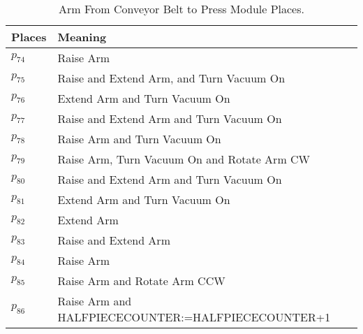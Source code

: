 \begin{table}[H]
\caption{Arm From Conveyor Belt to Press Module Places.}
\centering
\begin{tabular}{M{5cm}M{10cm}}
Places & Meaning\\
\hline
\hyperlink{partialNet:p741}{\hypertarget{partialTable:p74}{$p_{74}$}} & Raise Arm\\
\hyperlink{partialNet:p751}{\hypertarget{partialTable:p75}{$p_{75}$}} & Raise and Extend Arm, and Turn Vacuum On\\
\hyperlink{partialNet:p761}{\hypertarget{partialTable:p76}{$p_{76}$}} & Extend Arm and Turn Vacuum On\\
\hyperlink{partialNet:p771}{\hypertarget{partialTable:p77}{$p_{77}$}} & Raise and Extend Arm and Turn Vacuum On\\
\hyperlink{partialNet:p781}{\hypertarget{partialTable:p78}{$p_{78}$}} & Raise Arm and Turn Vacuum On\\
\hyperlink{partialNet:p791}{\hypertarget{partialTable:p79}{$p_{79}$}} & Raise Arm, Turn Vacuum On and  Rotate Arm CW\\
\hyperlink{partialNet:p801}{\hypertarget{partialTable:p80}{$p_{80}$}} & Raise and Extend Arm and Turn Vacuum On\\
\hyperlink{partialNet:p811}{\hypertarget{partialTable:p81}{$p_{81}$}} & Extend Arm and  Turn Vacuum On\\
\hyperlink{partialNet:p821}{\hypertarget{partialTable:p82}{$p_{82}$}} & Extend Arm\\
\hyperlink{partialNet:p831}{\hypertarget{partialTable:p83}{$p_{83}$}} & Raise and Extend Arm\\
\hyperlink{partialNet:p841}{\hypertarget{partialTable:p84}{$p_{84}$}} & Raise Arm\\
\hyperlink{partialNet:p851}{\hypertarget{partialTable:p85}{$p_{85}$}} & Raise Arm and Rotate Arm CCW\\
\hyperlink{partialNet:p861}{\hypertarget{partialTable:p86}{$p_{86}$}} & Raise Arm and HALFPIECECOUNTER:=HALFPIECECOUNTER+1\\
\end{tabular}
\end{table}
